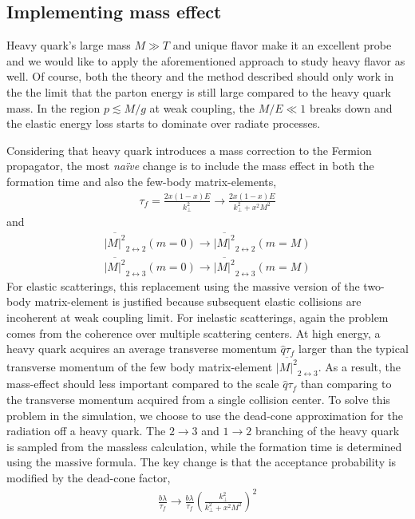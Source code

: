 \subsection{Implementing mass effect}
Heavy quark's large mass $M\gg T$ and unique flavor make it an excellent probe and we would like to apply the aforementioned approach to study heavy flavor as well. 
Of course, both the theory and the method described should only work in the the limit that the parton energy is still large compared to the heavy quark mass.
In the region $p \lesssim M/g$ at weak coupling, the $M/E \ll 1$ breaks down and the elastic energy loss starts to dominate over radiate processes.

Considering that heavy quark introduces a mass correction to the Fermion propagator, the most {\it na\"ive } change is to include the mass effect in both the formation time and also the few-body matrix-elements,
\begin{eqnarray}
\tau_f = \frac{2x(1-x)E}{k_\perp^2} \rightarrow \frac{2x(1-x)E}{k_\perp^2 + x^2 M^2}
\end{eqnarray}
and 
\begin{eqnarray}
\overline{|M|^2}_{2\leftrightarrow 2}(m=0) \rightarrow \overline{|M|^2}_{2\leftrightarrow 2}(m=M)\\
\overline{|M|^2}_{2\leftrightarrow 3}(m=0) \rightarrow \overline{|M|^2}_{2\leftrightarrow 3}(m=M)
\end{eqnarray}
For elastic scatterings, this replacement using the massive version of the two-body matrix-element is justified because subsequent elastic collisions are incoherent at weak coupling limit.
For inelastic scatterings, again the problem comes from the coherence over multiple scattering centers.
At high energy, a heavy quark acquires an average transverse momentum $\hat{q} \tau_f$ larger than the typical transverse momentum of the few body matrix-element $\overline{|M|^2}_{2\leftrightarrow 3}$.
As a result, the mass-effect should less important compared to the scale $\hat{q} \tau_f$ than comparing to the transverse momentum acquired from a single collision center. 
To solve this problem in the simulation, we choose to use the dead-cone approximation for the radiation off a heavy quark.
The $2\rightarrow 3$ and $1\rightarrow 2$ branching of the heavy quark is sampled from the massless calculation, while the formation time is determined using the massive formula.
The key change is that the acceptance probability is modified by the dead-cone factor,
\begin{eqnarray}
\frac{b\lambda}{\tau_f} \rightarrow \frac{b\lambda}{\tau_f} \left(\frac{k_\perp^2}{k_\perp^2+x^2M^2}\right)^2
\end{eqnarray}
